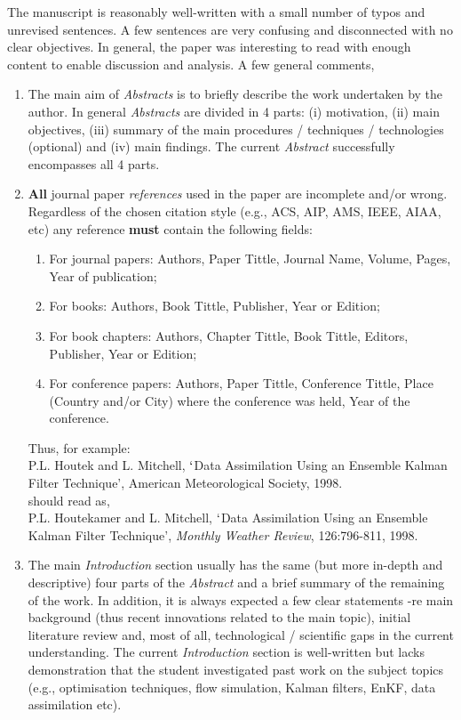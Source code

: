 \documentclass[14pt,twoside]{report}
\begin{document}
The manuscript is reasonably well-written with a small number of typos and unrevised sentences. A few sentences are very confusing and disconnected with no clear objectives. In general, the paper was interesting to read with enough content to enable discussion and analysis. A few general comments,
\begin{enumerate}
\item The main aim of {\it Abstracts} is to briefly describe the work undertaken by the author. In general {\it Abstracts} are divided in 4 parts: (i) motivation, (ii) main objectives, (iii) summary of the main procedures / techniques / technologies (optional) and (iv) main findings. The current {\it Abstract} successfully encompasses all 4 parts.
%
\item {\bf All} journal paper {\it references} used in the paper are incomplete and/or wrong. Regardless of the chosen citation style (e.g., ACS, AIP, AMS, IEEE, AIAA, etc) any reference {\bf must} contain the following fields: 
\begin{enumerate}
\item For journal papers: Authors, Paper Tittle, Journal Name, Volume, Pages, Year of publication;
\item For books: Authors, Book Tittle, Publisher, Year or Edition;
\item For book chapters: Authors, Chapter Tittle, Book Tittle, Editors, Publisher, Year or Edition;
\item For conference papers: Authors, Paper Tittle, Conference Tittle, Place (Country and/or City) where the conference was held, Year of the conference.
\end{enumerate}  
Thus, for example:\\
\noindent
[39] P.L. Houtek and L. Mitchell, $\lq$Data Assimilation Using an Ensemble Kalman Filter Technique', American Meteorological Society, 1998.\\
\noindent
should read as,\\
\noindent
[39] P.L. Houtekamer and L. Mitchell, $\lq$Data Assimilation Using an Ensemble Kalman Filter Technique', {\it Monthly Weather Review}, 126:796-811, 1998.
%
\item The main {\it Introduction} section usually has the same (but more in-depth and descriptive) four parts of the {\it Abstract} and a brief summary of the remaining of the work. In addition, it is always expected a few clear statements -re main background (thus recent innovations related to the main topic), initial literature review and, most of all, technological / scientific gaps in the current understanding. The current {\it Introduction} section is well-written but lacks demonstration that the student investigated past work on the subject topics (e.g., optimisation techniques, flow simulation, Kalman filters, EnKF, data assimilation etc).

\end{enumerate}
\end{document}
